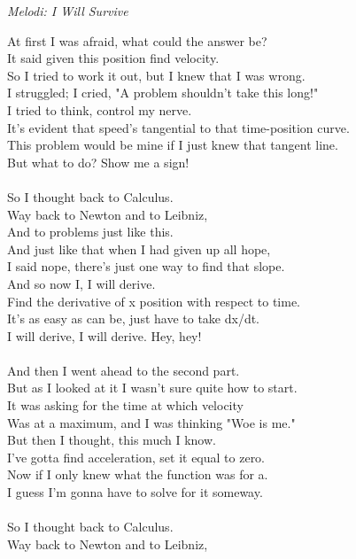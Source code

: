 {\footnotesize\textit{Melodi: I Will Survive}}\par
\vspace{10pt}
At first I was afraid, what could the answer be?\\
It said given this position find velocity.\\
So I tried to work it out, but I knew that I was wrong.\\
I struggled; I cried, "A problem shouldn't take this long!"\\
I tried to think, control my nerve.\\
It's evident that speed's tangential to that time-position curve.\\
This problem would be mine if I just knew that tangent line.\\
But what to do? Show me a sign!\\
\\
So I thought back to Calculus.\\
Way back to Newton and to Leibniz,\\
And to problems just like this.\\
And just like that when I had given up all hope,\\
I said nope, there's just one way to find that slope.\\
And so now I, I will derive.\\
Find the derivative of x position with respect to time.\\
It's as easy as can be, just have to take dx/dt.\\
I will derive, I will derive. Hey, hey!\\
\\
And then I went ahead to the second part.\\
But as I looked at it I wasn't sure quite how to start.\\
It was asking for the time at which velocity\\
Was at a maximum, and I was thinking "Woe is me."\\
But then I thought, this much I know.\\
I've gotta find acceleration, set it equal to zero.\\
Now if I only knew what the function was for a.\\
I guess I'm gonna have to solve for it someway.\\
\\
So I thought back to Calculus.\\
Way back to Newton and to Leibniz,\\
